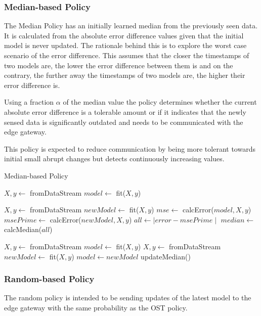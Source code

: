 \documentclass{mpaper}
\begin{document}
\subsubsection{Median-based Policy}
The Median Policy has an initially learned median from the previously seen data. It is calculated from the absolute error difference values given that the initial model is never updated. 
The rationale behind this is to explore the worst case scenario of the error difference. This assumes that the closer the timestamps of two models are, the lower the error difference between them is and on the contrary, the further away the timestamps of two models are, the higher their error difference is.

Using a fraction $\alpha$ of the median value the policy determines whether the current absolute error difference is a tolerable amount or if it indicates that the newly sensed data is significantly outdated and needs to be communicated with the edge gateway.

This policy is expected to reduce communication by being more tolerant towards initial small abrupt changes but detects continuously increasing values.

\begin{algorithm}[h!]
\caption{Median-based Policy}\label{polM}
\begin{algorithmic}
    \State $X, y \gets$ fromDataStream
    \State $model \gets$ fit($X,y$)
    
        \State $X, y \gets$ fromDataStream
        \State $newModel \gets$ fit($X,y$)
        \State $mse \gets$ calcError($model,X,y$)
        \State $msePrime \gets$ calcError($newModel,X,y$)
        \State $all \gets \mid error - msePrime \mid$
    \EndFor
    \State $median \gets$ calcMedian($all$)
\EndProcedure

\State $X, y \gets$ fromDataStream
\State $model \gets$ fit($X,y$)
    \State $X, y \gets$ fromDataStream
    \State $newModel \gets$ fit($X,y$)
        \State $model \gets newModel$ 
    \EndIf
        \State updateMedian()
    \EndIf
\EndWhile
\end{algorithmic}
\end{algorithm}

\subsubsection{Random-based Policy}
The random policy is intended to be sending updates of the latest model to the edge gateway with the same probability as the OST policy.
\end{document}
